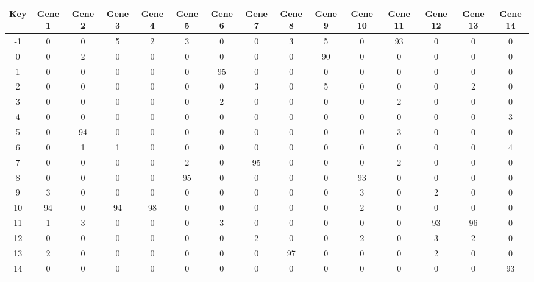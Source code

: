 \begin{tabular}{|c|c|c|c|c|c|c|c|c|c|c|c|c|c|c|}
\hline
Key & Gene 1 & Gene 2 & Gene 3 & Gene 4 & Gene 5 & Gene 6 & Gene 7 & Gene 8 & Gene 9 & Gene 10 & Gene 11 & Gene 12 & Gene 13 & Gene 14 \\
\hline
-1 & 0 & 0 & 5 & 2 & 3 & 0 & 0 & 3 & 5 & 0 & 93 & 0 & 0 & 0 \\
0 & 0 & 2 & 0 & 0 & 0 & 0 & 0 & 0 & 90 & 0 & 0 & 0 & 0 & 0 \\
1 & 0 & 0 & 0 & 0 & 0 & 95 & 0 & 0 & 0 & 0 & 0 & 0 & 0 & 0 \\
2 & 0 & 0 & 0 & 0 & 0 & 0 & 3 & 0 & 5 & 0 & 0 & 0 & 2 & 0 \\
3 & 0 & 0 & 0 & 0 & 0 & 2 & 0 & 0 & 0 & 0 & 2 & 0 & 0 & 0 \\
4 & 0 & 0 & 0 & 0 & 0 & 0 & 0 & 0 & 0 & 0 & 0 & 0 & 0 & 3 \\
5 & 0 & 94 & 0 & 0 & 0 & 0 & 0 & 0 & 0 & 0 & 3 & 0 & 0 & 0 \\
6 & 0 & 1 & 1 & 0 & 0 & 0 & 0 & 0 & 0 & 0 & 0 & 0 & 0 & 4 \\
7 & 0 & 0 & 0 & 0 & 2 & 0 & 95 & 0 & 0 & 0 & 2 & 0 & 0 & 0 \\
8 & 0 & 0 & 0 & 0 & 95 & 0 & 0 & 0 & 0 & 93 & 0 & 0 & 0 & 0 \\
9 & 3 & 0 & 0 & 0 & 0 & 0 & 0 & 0 & 0 & 3 & 0 & 2 & 0 & 0 \\
10 & 94 & 0 & 94 & 98 & 0 & 0 & 0 & 0 & 0 & 2 & 0 & 0 & 0 & 0 \\
11 & 1 & 3 & 0 & 0 & 0 & 3 & 0 & 0 & 0 & 0 & 0 & 93 & 96 & 0 \\
12 & 0 & 0 & 0 & 0 & 0 & 0 & 2 & 0 & 0 & 2 & 0 & 3 & 2 & 0 \\
13 & 2 & 0 & 0 & 0 & 0 & 0 & 0 & 97 & 0 & 0 & 0 & 2 & 0 & 0 \\
14 & 0 & 0 & 0 & 0 & 0 & 0 & 0 & 0 & 0 & 0 & 0 & 0 & 0 & 93 \\
\hline
\end{tabular}